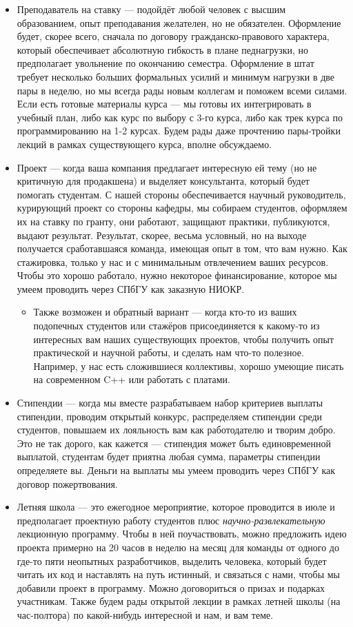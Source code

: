 \documentclass[a5paper]{article}
\begin{document}
\begin{itemize}
    \item Преподаватель на ставку --- подойдёт любой человек с высшим образованием, опыт преподавания желателен, но не обязателен. Оформление будет, скорее всего, сначала по договору гражданско-правового характера, который обеспечивает абсолютную гибкость в плане педнагрузки, но предполагает увольнение по окончанию семестра. Оформление в штат требует несколько больших формальных усилий и минимум нагрузки в две пары в неделю, но мы всегда рады новым коллегам и поможем всеми силами. Если есть готовые материалы курса --- мы готовы их интегрировать в учебный план, либо как курс по выбору с 3-го курса, либо как трек курса по программированию на 1-2 курсах. Будем рады даже прочтению пары-тройки лекций в рамках существующего курса, вполне обсуждаемо.
    \item Проект --- когда ваша компания предлагает интересную ей тему (но не критичную для продакшена) и выделяет консультанта, который будет помогать студентам. С нашей стороны обеспечивается научный руководитель, курирующий проект со стороны кафедры, мы собираем студентов, оформляем их на ставку по гранту, они работают, защищают практики, публикуются, выдают результат. Результат, скорее, весьма условный, но на выходе получается сработавшаяся команда, имеющая опыт в том, что вам нужно. Как стажировка, только у нас и с минимальным отвлечением ваших ресурсов. Чтобы это хорошо работало, нужно некоторое финансирование, которое мы умеем проводить через СПбГУ как заказную НИОКР.
    \begin{itemize}
        \item Также возможен и обратный вариант --- когда кто-то из ваших подопечных студентов или стажёров присоединяется к какому-то из интересных вам наших существующих проектов, чтобы получить опыт практической и научной работы, и сделать нам что-то полезное. Например, у нас есть сложившиеся коллективы, хорошо умеющие писать на современном C++ или работать с платами.
    \end{itemize}
    \item Стипендии --- когда мы вместе разрабатываем набор критериев выплаты стипендии, проводим открытый конкурс, распределяем стипендии среди студентов, повышаем их лояльность вам как работодателю и творим добро. Это не так дорого, как кажется --- стипендия может быть единовременной выплатой, студентам будет приятна любая сумма, параметры стипендии определяете вы. Деньги на выплаты мы умеем проводить через СПбГУ как договор пожертвования.
    \item Летняя школа --- это ежегодное мероприятие, которое проводится в июле и предполагает проектную работу студентов плюс \emph{научно-развлекательную} лекционную программу. Чтобы в ней поучаствовать, можно предложить идею проекта примерно на 20 часов в неделю на месяц для команды от одного до где-то пяти неопытных разработчиков, выделить человека, который будет читать их код и наставлять на путь истинный, и связаться с нами, чтобы мы добавили проект в программу. Можно договориться о призах и подарках участникам. Также будем рады открытой лекции в рамках летней школы (на час-полтора) по какой-нибудь интересной и нам, и вам теме.

\end{itemize}
\end{document}
